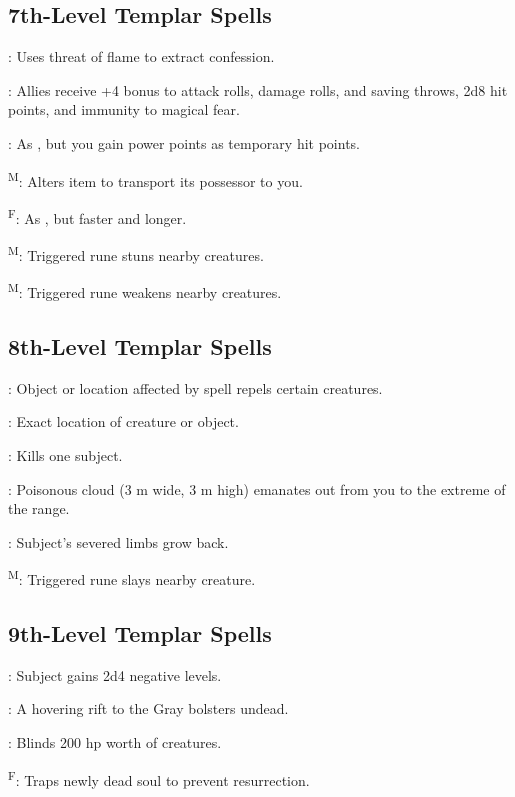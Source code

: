 \subsection{7th-Level Templar Spells}

: Uses threat of flame to extract confession.

: Allies receive +4 bonus to attack rolls, damage rolls, and saving throws, 2d8 hit points, and immunity to magical fear.

: As , but you gain power points as temporary hit points.

\textsuperscript{M}: Alters item to transport its possessor to you.

\textsuperscript{F}: As , but faster and longer.

\textsuperscript{M}: Triggered rune stuns nearby creatures.

\textsuperscript{M}: Triggered rune weakens nearby creatures.



\subsection{8th-Level Templar Spells}

: Object or location affected by spell repels certain creatures.

: Exact location of creature or object.

: Kills one subject.

: Poisonous cloud (3 m wide, 3 m high) emanates out from you to the extreme of the range.

: Subject's severed limbs grow back.

\textsuperscript{M}: Triggered rune slays nearby creature.



\subsection{9th-Level Templar Spells}

: Subject gains 2d4 negative levels.

: A hovering rift to the Gray bolsters
undead.

: Blinds 200 hp worth of creatures.

\textsuperscript{F}: Traps newly dead soul to prevent
resurrection.
